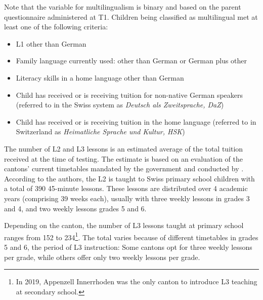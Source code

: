 \documentclass[output=paper]{langsci/langscibook}
\begin{document}
Note that the variable for multilingualism is binary and based on the parent questionnaire administered at T1. Children being classified as multilingual met at least one of the following criteria:

\begin{itemize}
\item L1 other than German
\item Family language currently used: other than German or German plus other
\item Literacy skills in a home language other than German
\item Child has received or is receiving tuition for non-native German speakers (referred to in the Swiss system as \textit{Deutsch als Zweitsprache, DaZ})
\item Child has received or is receiving tuition in the home language (referred to in Switzerland as \textit{Heimatliche Sprache und Kultur, HSK})
\end{itemize}

The number of L2 and L3 lessons is an estimated average of the total tuition received at the time of testing. The estimate is based on an evaluation of the cantons’ current timetables mandated by the government and conducted by \citet{BucherZemp2019}. According to the authors, the L2 is taught to Swiss primary school children with a total of 390 45-minute lessons. These lessons are distributed over 4 academic years (comprising 39 weeks each), usually with three weekly lessons in grades 3 and 4, and two weekly lessons grades 5 and 6.

Depending on the canton, the number of L3 lessons taught at primary school ranges from 152 to 234\footnote{In 2019, Appenzell Innerrhoden was the only canton to introduce L3 teaching at secondary school.}. The total varies because of different timetables in grades 5 and 6, the period of L3 instruction: Some cantons opt for three weekly lessons per grade, while others offer only two weekly lessons per grade. 


\begin{table}
\caption{Participants LAPS I\label{tab:02:2}}
\end{table}
\end{document}
